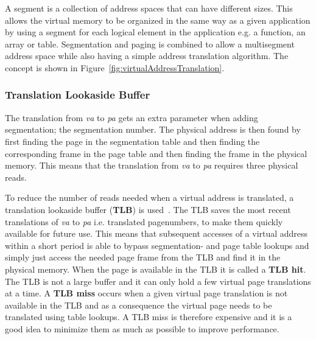 A segment is a collection of address spaces that can have different sizes.
This allows the virtual memory to be organized in the same way as a given application by using a segment for each logical element in the application e.g. a function, an array or table.
Segmentation and paging is combined to allow a multisegment address space while also having a simple address translation algorithm. 
The concept is shown in Figure~\ref{fig:virtualAddressTranslation}.

\subsubsection{Translation Lookaside Buffer}
The translation from \textit{va} to \textit{pa} gets an extra parameter when adding segmentation; the segmentation number.
The physical address is then found by first finding the page in the segmentation table and then finding the corresponding frame in the page table and then finding the frame in the physical memory. 
This means that the translation from \textit{va} to \textit{pa} requires three physical reads.

To reduce the number of reads needed when a virtual address is translated, a translation lookaside buffer (\textbf{TLB}) is used~\citep[Section~8.2.5]{OperatingSystemPrinciples}.
The TLB saves the most recent translations of \textit{va} to \textit{pa} i.e. translated pagenumbers, to make them quickly available for future use.
This means that subsequent accesses of a virtual address within a short period is able to bypass segmentation- and page table lookups and simply just access the needed page frame from the TLB and find it in the physical memory.
When the page is available in the TLB it is called a \textbf{TLB hit}.
The TLB is not a large buffer and it can only hold a few virtual page translations at a time. 
A \textbf{TLB miss} occurs when a given virtual page translation is not available in the TLB and as a consequence the virtual page needs to be translated using table lookups. 
A TLB miss is therefore expensive and it is a good idea to minimize them as much as possible to improve performance.
